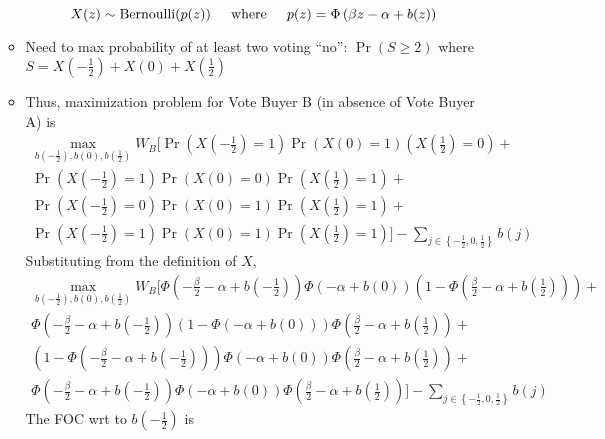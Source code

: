 \documentclass[12pt]{article}
\begin{document}
\begin{itemize}
\begin{itemize}
				\[
				  X(z) \sim \text{Bernoulli}(p(z)) \hskip.2in \text{where} \hskip.2in p(z) = \Phi\left(\beta z - \alpha + b(z) \right)
				\]
			\item Need to max probability of at least two voting ``no'': $\Pr(S \geq 2)$ where $S = X\left(-\frac{1}{2}\right) + X\left(0\right) + X\left(\frac{1}{2}\right)$
			\item Thus, maximization problem for Vote Buyer B (in absence of Vote Buyer A) is
			  \begin{multline}
			    \max_{b\left(-\frac{1}{2}\right), b\left(0\right), b\left(\frac{1}{2}\right)} 
					W_B \biggl[ \Pr\left(X\left(-\frac{1}{2}\right)=1\right)\Pr\left(X\left(0\right)=1\right)\left(X\left(\frac{1}{2}\right)=0\right)  + \\
					\Pr\left(X\left(-\frac{1}{2}\right)=1\right)\Pr\left(X\left(0\right)=0\right)\Pr\left(X\left(\frac{1}{2}\right)=1\right) + \\
					\Pr\left(X\left(-\frac{1}{2}\right)=0\right)\Pr\left(X\left(0\right)=1\right)\Pr\left(X\left(\frac{1}{2}\right)=1\right) + \\
					\Pr\left(X\left(-\frac{1}{2}\right)=1\right)\Pr\left(X\left(0\right)=1\right)\Pr\left(X\left(\frac{1}{2}\right)=1\right) \biggr] - \sum_{j\in \left\{-\frac{1}{2}, 0,\frac{1}{2}\right\}} b(j)
				\end{multline}
			Substituting from the definition of $X$,
			  \begin{multline}
			    \max_{b\left(-\frac{1}{2}\right), b\left(0\right), b\left(\frac{1}{2}\right)} 
					W_B \biggl[ \Phi\left(-\frac{\beta}{2} - \alpha + b(-\frac{1}{2}) \right)\Phi\left(- \alpha + b(0) \right)\left(1-\Phi\left(\frac{\beta}{2} - \alpha + b(\frac{1}{2}) \right)\right)  + \\
					\Phi\left(-\frac{\beta}{2} - \alpha + b(-\frac{1}{2}) \right)\left(1-\Phi\left(- \alpha + b(0) \right)\right)\Phi\left(\frac{\beta}{2} - \alpha + b(\frac{1}{2}) \right) + \\
					\left(1-\Phi\left(-\frac{\beta}{2} - \alpha + b(-\frac{1}{2}) \right)\right)\Phi\left(- \alpha + b(0) \right)\Phi\left(\frac{\beta}{2} - \alpha + b(\frac{1}{2}) \right) + \\
					\Phi\left(-\frac{\beta}{2} - \alpha + b(-\frac{1}{2}) \right)\Phi\left(- \alpha + b(0) \right)\Phi\left(\frac{\beta}{2} - \alpha + b(\frac{1}{2}) \right) \biggr] - \sum_{j\in \left\{-\frac{1}{2}, 0,\frac{1}{2}\right\}} b(j)
					\label{eq:obj}
				\end{multline}
			The FOC wrt to $b\left(-\frac{1}{2}\right)$ is

\end{itemize}
\end{itemize}
\end{document}
